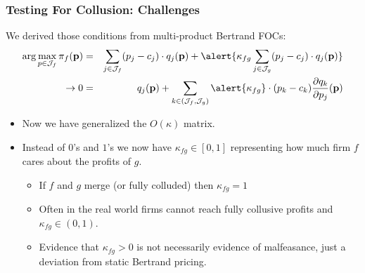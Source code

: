 \documentclass[xcolor=pdftex,dvipsnames,table,mathserif]{beamer}
\begin{document}
\begin{frame}
\frametitle{Testing For Collusion: Challenges}
We derived those conditions from multi-product Bertrand FOCs:
\begin{eqnarray*}
\arg \max_{p \in \mathcal{J}_f} \pi_f (\mathbf{p}) &=& \sum_{j \in \mathcal{J}_f} (p_j - c_j) \cdot q_j(\mathbf{p}) +  \alert{\kappa_{fg} \sum_{j \in \mathcal{J}_g} (p_j - c_j) \cdot q_j(\mathbf{p})} \\
\rightarrow 0&=& q_j(\mathbf{p}) + \sum_{k \in (\mathcal{J}_f,\mathcal{J}_g)} \alert{\kappa_{fg}}\cdot (p_k - c_k) \frac{\partial q_{k}}{\partial p_j}(\mathbf{p}) 
\end{eqnarray*}
\begin{itemize}
\item Now we have generalized the $O(\kappa)$ matrix.
\item Instead of $0$'s and $1$'s we now have $\kappa_{fg} \in [0,1]$ representing how much firm $f$ cares about the profits of $g$.
\begin{itemize}
\item If $f$ and $g$ merge (or fully colluded) then $\kappa_{fg} =1$
\item Often in the real world firms cannot reach fully collusive profits and $\kappa_{fg} \in (0,1)$.
\item Evidence that $\kappa_{fg} > 0$ is not necessarily evidence of malfeasance, just a deviation from \alert{static Bertrand pricing}.
\end{itemize}
\end{itemize}
\end{frame}
\end{document}
